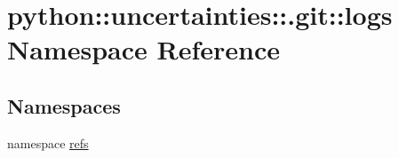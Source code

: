 \hypertarget{namespacepython_1_1uncertainties_1_1_8git_1_1logs}{
\section{python::uncertainties::.git::logs Namespace Reference}
\label{namespacepython_1_1uncertainties_1_1_8git_1_1logs}
}
\subsection*{Namespaces}
\begin{DoxyCompactItemize}
\item 
namespace \hyperlink{namespacepython_1_1uncertainties_1_1_8git_1_1logs_1_1refs}{refs}
\end{DoxyCompactItemize}
